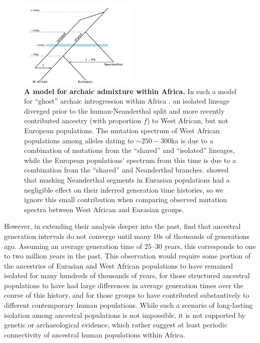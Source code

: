 \documentclass[]{article}
\begin{document}
\begin{figure}[t!]
    \centering
    \includegraphics[width=0.5\textwidth]{../plots/durvasula_model}
    \caption{
        \textbf{A model for archaic admixture within Africa.} In such a model
        for ``ghost'' archaic introgression within Africa
        \citep{durvasula2020recovering}, an isolated lineage diverged prior to
        the human-Neanderthal split and more recently contributed ancestry
        (with proportion $f$) to West African, but not European populations.
        The mutation spectrum of West African populations among alleles dating
        to $\sim250-300$ka is due to a combination of mutations from the
        ``shared'' and ``isolated'' lineages, while the European populations'
        spectrum from this time is due to a combination from the ``shared'' and
        Neanderthal branches.  \citet{wang2023human} showed that masking
        Neanderthal segments in Eurasian populations had a negligible effect on
        their inferred generation time histories, so we ignore this small
        contribution when comparing observed mutation spectra between West
        African and Eurasian groups.
    }
    \label{fig:durvasula-model}
\end{figure}

However, in extending their analysis deeper into the past,
\citet{wang2023human} find that ancestral generation intervals do not converge
until many 10s of thousands of generations ago. Assuming an average generation
time of 25--30 years, this corresponds to one to two million years in the past.
This observation would require some portion of the ancestries of Eurasian and
West African populations to have remained isolated for many hundreds of
thousands of years, for those structured ancestral populations to have had
large differences in average generation times over the course of this history,
and for those groups to have contributed substantively to different
contemporary human populations. While such a scenario of long-lasting isolation
among ancestral populations is not impossible, it is not supported by genetic
\citep[e.g.,][]{ragsdale2022weakly} or archaeological
\citep[e.g.,][]{scerri2018did} evidence, which rather suggest at least periodic
connectivity of ancestral human populations within Africa.
\end{document}
